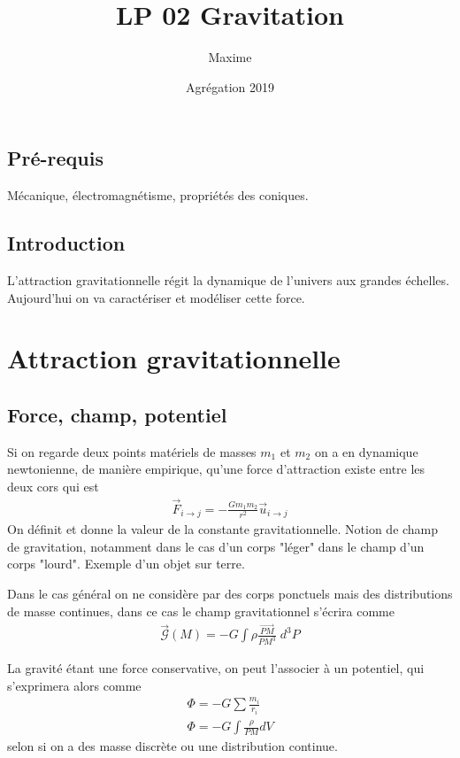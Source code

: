 \documentclass[12pt,prb,aps,epsf]{article}
\begin{document}
	
	\title{LP 02 Gravitation}
	\author{Maxime}
	\date{Agrégation 2019}

	\maketitle
	
	\tableofcontents
	
	\pagebreak
	
\subsection{Pré-requis}
Mécanique, électromagnétisme, propriétés des coniques.

\subsection{Introduction}
L'attraction gravitationnelle régit la dynamique de l'univers aux grandes échelles. Aujourd'hui on va caractériser et modéliser cette force.

\section{Attraction gravitationnelle}
\subsection{Force, champ, potentiel}
Si on regarde deux points matériels de masses $m_1$ et $m_2$ on a en dynamique newtonienne, de manière empirique, qu'une force d'attraction existe entre les deux cors qui est 
\begin{eqnarray}
\vec{F}_{i\rightarrow j} = -\frac{Gm_1m_2}{r^2} \vec{u}_{i\rightarrow j}
\end{eqnarray}
On définit et donne la valeur de la constante gravitationnelle. Notion de champ de gravitation, notamment dans le cas d'un corps "léger" dans le champ d'un corps "lourd". Exemple d'un objet sur terre.

Dans le cas général on ne considère par des corps ponctuels mais des distributions de masse continues, dans ce cas le champ gravitationnel s'écrira comme 
\begin{eqnarray}
\vec{\mathcal{G}} (M) = -G\int \rho \frac{\vec{PM}}{PM^3} \; d^3P
\end{eqnarray}

La gravité étant une force conservative, on peut l'associer à un potentiel, qui s'exprimera alors comme
\begin{eqnarray}
\Phi = -G \sum \frac{m_i}{r_i}\\
\Phi = -G \int \frac{\rho}{PM} dV
\end{eqnarray}
selon si on a des masse discrète ou une distribution continue.\\
\end{document}
